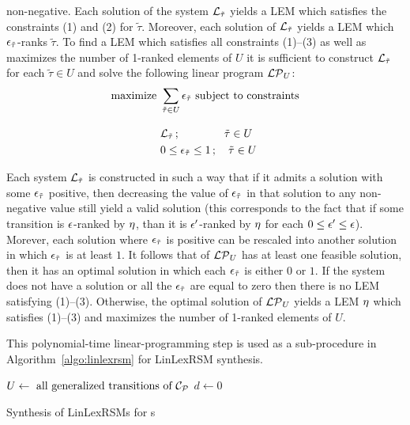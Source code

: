   non-negative. Each solution of the system $\mathcal{L}_{\tilde{\tau}}$ yields 
  a LEM which satisfies the constraints (1) and (2) for $\tilde{\tau}$. 
  Moreover, each solution of $\mathcal{L}_{\tilde{\tau}}$ yields a LEM which 
  $\epsilon_{\tilde{\tau}}$-ranks $\tilde{\tau}$. To find a LEM which satisfies all 
  constraints (1)--(3) as well as maximizes the number of 1-ranked elements of 
  $U$ it is sufficient to construct $\mathcal{L}_{\tilde{\tau}}$ for each 
  $\tilde{\tau}\in U$ and solve the following linear program $\mathcal{LP}_{U}$:
  \begin{align*}
\text{maximize }  &\sum_{\tilde{\tau} \in U} \epsilon_{\tilde\tau} \text{ subject to constraints}\\[0.3cm]
&\mathcal{L}_{\tilde{\tau}}\,;\quad\quad \quad\quad\tilde{\tau}\in U\\
&0 \leq \epsilon_{\tilde{\tau}} \leq 1\,; \quad \tilde{\tau}\in U
  \end{align*}
  
Each system $\mathcal{L}_{\tilde{\tau}}$ is constructed in such a way that if it admits a solution with some $\epsilon_{\tilde{\tau}}$ positive, then decreasing the value of $\epsilon_{\tilde{\tau}}$ in that solution to any non-negative value still yield a valid solution (this corresponds to the fact that if some transition is $\epsilon$-ranked by $\eta$, than it is $\epsilon'$-ranked by $\eta$ for each $0\leq \epsilon'\leq \epsilon$). Morever, each solution where $\epsilon_{\tilde{\tau}}$ is positive can be rescaled into another solution in which $\epsilon_{\tilde{\tau}}$ is at least $1$. It follows that of $\mathcal{LP}_{U}$ has at least one feasible solution, then it has an optimal solution in which each $\epsilon_{\tilde{\tau}}$ is either $0$ or $1$. If the system does not have a solution or all the $\epsilon_{\tilde{\tau}}$ are equal to zero then there is no LEM satisfying (1)--(3). Otherwise, the optimal solution of $\mathcal{LP}_{U}$ yields a LEM $\eta$ which satisfies (1)--(3) and maximizes the number of 1-ranked elements of $U$.

This polynomial-time linear-programming step is used as a sub-procedure in Algorithm~\ref{algo:linlexrsm} for LinLexRSM synthesis. 

\begin{algorithm}
\DontPrintSemicolon

$U \leftarrow \text{ all generalized transitions of } \mathcal{C}_{\mathcal{P}}$\;
$d\leftarrow 0$\;
\caption{Synthesis of LinLexRSMs for \APP{}s}
\label{algo:linlexrsm}
\end{algorithm}

